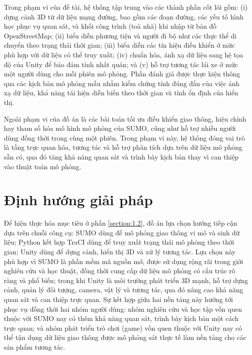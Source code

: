 \documentclass[../DoAn.tex]{subfiles}
\begin{document}
Trong phạm vi của đề tài, hệ thống tập trung vào các thành phần cốt lõi gồm: (i)
dựng cảnh 3D từ dữ liệu mạng đường, bao gồm các đoạn đường, các yếu tố hình
học phục vụ quan sát, và khối công trình (toà nhà) khi nhập từ bản đồ
OpenStreetMap; (ii) biểu diễn phương tiện và người đi bộ như các thực thể
di chuyển theo trạng thái thời gian; (iii) biểu diễn các tín hiệu điều khiển ở
mức phù hợp với dữ liệu có thể truy xuất; (iv) chuẩn hóa, ánh xạ dữ liệu sang hệ
tọa độ của Unity để bảo đảm tính nhất quán; và (v) hỗ trợ tương tác lái xe ở mức
một người dùng cho mỗi phiên mô phỏng. Phần đánh giá được thực hiện thông qua
các kịch bản mô phỏng mẫu nhằm kiểm chứng tính đúng đắn của việc ánh xạ dữ liệu,
khả năng tái hiện diễn biến theo thời gian và tính ổn định của hiển thị.

Ngoài phạm vi của đồ án là các bài toán tối ưu điều khiển giao thông, hiệu
chỉnh hay tham số hóa mô hình mô phỏng của \gls{SUMO}, cũng như hỗ trợ nhiều
người dùng đồng thời trong cùng một phiên. Trong phạm vi này, hệ thống đóng vai
trò là tầng trực quan hóa, tương tác và hỗ trợ phân tích dựa trên dữ liệu mô
phỏng sẵn có, qua đó tăng khả năng quan sát và trình bày kịch bản thay vì can
thiệp vào thuật toán mô phỏng.

\section{Định hướng giải pháp}
\label{section:1.3}

Để hiện thực hóa mục tiêu ở phần \ref{section:1.2}, đồ án lựa chọn hướng tiếp cận
dựa trên chuỗi công cụ: \gls{SUMO} dùng để mô phỏng giao thông vi mô và sinh dữ
liệu; Python kết hợp \gls{TraCI} dùng để truy xuất trạng thái mô phỏng theo thời
gian; Unity dùng để dựng cảnh, hiển thị 3D và xử lý tương tác. Lựa chọn này phù
hợp vì \gls{SUMO} là phần mềm mã nguồn mở, được sử dụng rộng rãi trong giới
nghiên cứu và học thuật, đồng thời cung cấp dữ liệu mô phỏng có cấu trúc rõ ràng
và phổ biến; trong khi Unity là môi trường phát triển 3D mạnh, hỗ trợ dựng cảnh,
quản lý đối tượng, camera, vật lý và tương tác, qua đó nâng cao khả năng quan sát
và can thiệp trực quan. Sự kết hợp giữa hai nền tảng này hướng tới phục vụ đồng
thời hai nhóm người dùng: nhóm nghiên cứu và học tập vốn quen thuộc với \gls{SUMO}
nay có thêm khả năng quan sát, trình bày kịch bản một cách trực quan; và nhóm
phát triển trò chơi (game) vốn quen thuộc với Unity nay có thể tận dụng dữ liệu
giao thông được mô phỏng sát thực tế làm nền tảng cho các sản phẩm tương tác.
\end{document}
